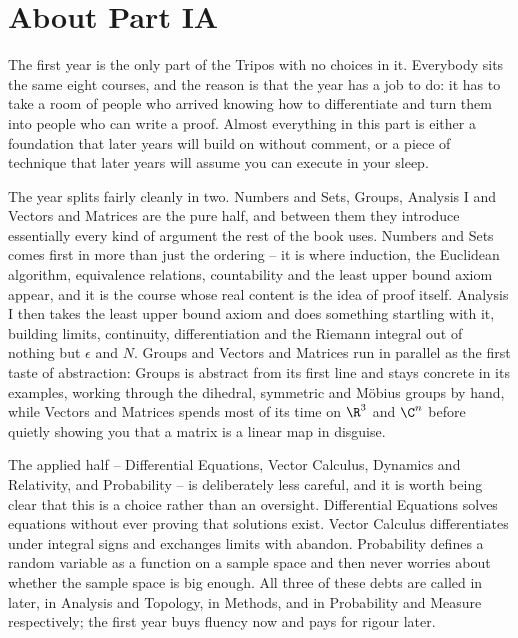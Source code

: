 {}
\section*{About Part IA}

The first year is the only part of the Tripos with no choices in it. Everybody sits the
same eight courses, and the reason is that the year has a job to do: it has to take a
room of people who arrived knowing how to differentiate and turn them into people who
can write a proof. Almost everything in this part is either a foundation that later
years will build on without comment, or a piece of technique that later years will
assume you can execute in your sleep.

The year splits fairly cleanly in two. Numbers and Sets, Groups, Analysis I and Vectors
and Matrices are the pure half, and between them they introduce essentially every kind
of argument the rest of the book uses. Numbers and Sets comes first in more than just
the ordering -- it is where induction, the Euclidean algorithm, equivalence relations,
countability and the least upper bound axiom appear, and it is the course whose real
content is the idea of proof itself. Analysis I then takes the least upper bound axiom
and does something startling with it, building limits, continuity, differentiation and
the Riemann integral out of nothing but $\epsilon$ and $N$. Groups and Vectors and
Matrices run in parallel as the first taste of abstraction: Groups is abstract from its
first line and stays concrete in its examples, working through the dihedral, symmetric
and M\"obius groups by hand, while Vectors and Matrices spends most of its time on
$\R^3$ and $\C^n$ before quietly showing you that a matrix is a linear map in
disguise.

The applied half -- Differential Equations, Vector Calculus, Dynamics and Relativity,
and Probability -- is deliberately less careful, and it is worth being clear that this
is a choice rather than an oversight. Differential Equations solves equations without
ever proving that solutions exist. Vector Calculus differentiates under integral signs
and exchanges limits with abandon. Probability defines a random variable as a function
on a sample space and then never worries about whether the sample space is big enough.
All three of these debts are called in later, in Analysis and Topology, in Methods, and
in Probability and Measure respectively; the first year buys fluency now and pays for
rigour later.

